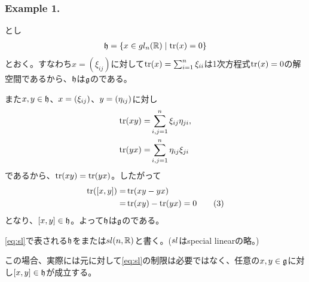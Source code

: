 \documentclass[../main]{subfiles}
\begin{document}
\subsubsection*{Example 1.}
\begin{remark}
  とし
  \begin{align}
    \h=\qty{x\in\gl_n(\R) \mid \tr(x)=0} \label{eq:sl}
  \end{align}
  とおく。すなわち$x=(\xi_{ij})$に対して$\tr(x)=\sum_{i=1}^{n}\xi_{ii}$は1次方程式$\tr(x)=0$の解空間であるから、$\h$は$\g$の{}である。

  また$x,y\in\h$、$x=\qty(\xi_{ij})$、$y=\qty(\eta_{ij})$に対し
  \begin{align*}
    \tr(xy) =& \sum_{i,j=1}^{n}\xi_{ij}\eta_{ji},\\
    \tr(yx) =& \sum_{i,j=1}^{n}\eta_{ij}\xi_{ji}
  \end{align*}
  であるから、$\tr(xy)=\tr(yx)$。したがって
  \begin{align*}
    \tr(\comm{x}{y})=&\tr(xy-yx)\\
    =&\tr(xy)-\tr(yx)=0 \tag{3}\label{eq:2_(3)}
  \end{align*}
  となり、$\comm{x}{y}\in\h$。よって$\h$は$\g$の{}である。
\end{remark}

\begin{named}
  \eqref{eq:sl}で表される$\h$をまたは$\sl(n,\R)$と書く。($\sl$はspecial linearの略。)
\end{named}

\begin{remark}
  この場合、実際には元に対して\eqref{eq:sl}の制限は必要ではなく、任意の$x,y\in\g$に対し$\comm{x}{y}\in\h$が成立する。
\end{remark}
\end{document}
